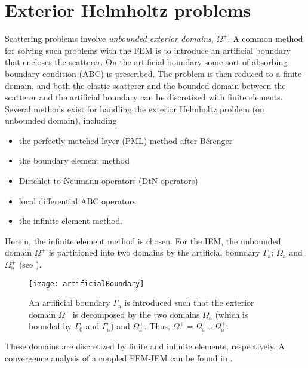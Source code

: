 \section{Exterior Helmholtz problems}
\label{Sec2:exteriorHelmholtz}
Scattering problems involve \textit{unbounded exterior domains}, $\Omega^+$. A common method for solving such problems with the FEM is to introduce an artificial boundary that encloses the scatterer. On the artificial boundary some sort of absorbing boundary condition (ABC) is prescribed. The problem is then reduced to a finite domain, and both the elastic scatterer and the bounded domain between the scatterer and the artificial boundary can be discretized with finite elements. Several methods exist for handling the exterior Helmholtz problem (on unbounded domain), including
\begin{itemize}
	\item the perfectly matched layer (PML) method after B{\'e}renger~\cite{Berenger1994apm,Berenger1996pml}
	\item the boundary element method~\cite{Sauter2011bem,Schanz2007bea,Marburg2008cao,Chandler_Wilde2012nab}
	\item Dirichlet to Neumann-operators (DtN-operators)~\cite{Givoli2013nmf}
	\item local differential ABC operators~\cite{Shirron1995soe,Bayliss1982bcf,Hagstrom1998afo,Tezaur2001tdf}
	\item the infinite element method.~\cite{Bettess1977ie,Bettess1977dar}
\end{itemize}
Herein, the infinite element method is chosen. For the IEM, the unbounded domain $\Omega^+$ is partitioned into two domains by the artificial boundary $\Gamma_{\mathrm{a}}$; $\Omega_{\mathrm{a}}$ and $\Omega_{\mathrm{a}}^+$ (see ). 
\begin{figure}
	\centering
	\texttt{[image: artificialBoundary]}
	\caption[Illustration of artificial boundary]{An artificial boundary $\Gamma_{\mathrm{a}}$ is introduced such that the exterior domain $\Omega^+$ is decomposed by the two domains $\Omega_{\mathrm{a}}$ (which is bounded by $\Gamma_0$ and $\Gamma_{\mathrm{a}}$) and $\Omega_{\mathrm{a}}^+$. Thus, $\Omega^+ = \Omega_{\mathrm{a}} \cup \Omega_{\mathrm{a}}^+$.}
	\label{Fig2:artificialBoundary}
\end{figure}
These domains are discretized by finite and infinite elements, respectively. A convergence analysis of a coupled FEM-IEM can be found in \cite{Demkowicz2001aoa}.

